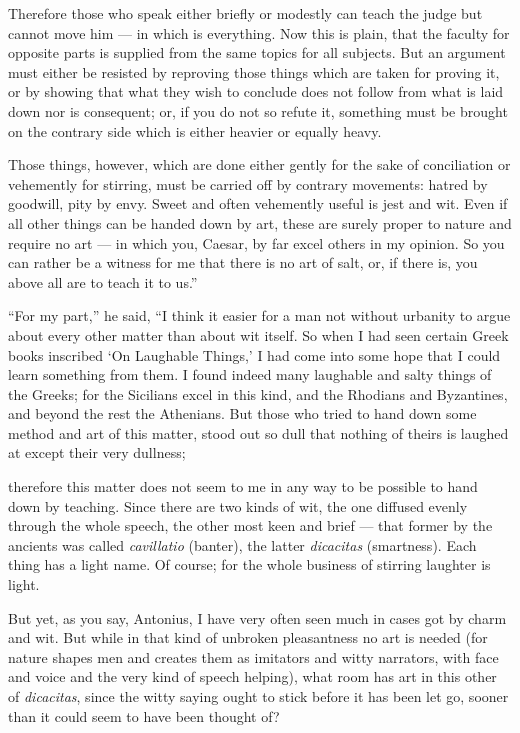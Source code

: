  Therefore those who speak either briefly or modestly can teach the judge but cannot move him — in which is everything. Now this is plain, that the faculty for opposite parts is supplied from the same topics for all subjects. But an argument must either be resisted by reproving those things which are taken for proving it, or by showing that what they wish to conclude does not follow from what is laid down nor is consequent; or, if you do not so refute it, something must be brought on the contrary side which is either heavier or equally heavy.

 Those things, however, which are done either gently for the sake of conciliation or vehemently for stirring, must be carried off by contrary movements: hatred by goodwill, pity by envy. Sweet and often vehemently useful is jest and wit. Even if all other things can be handed down by art, these are surely proper to nature and require no art — in which you, Caesar, by far excel others in my opinion. So you can rather be a witness for me that there is no art of salt, or, if there is, you above all are to teach it to us.''

 ``For my part,'' he said, ``I think it easier for a man not without urbanity to argue about every other matter than about wit itself. So when I had seen certain Greek books inscribed `On Laughable Things,' I had come into some hope that I could learn something from them. I found indeed many laughable and salty things of the Greeks; for the Sicilians excel in this kind, and the Rhodians and Byzantines, and beyond the rest the Athenians. But those who tried to hand down some method and art of this matter, stood out so dull that nothing of theirs is laughed at except their very dullness;

 therefore this matter does not seem to me in any way to be possible to hand down by teaching. Since there are two kinds of wit, the one diffused evenly through the whole speech, the other most keen and brief — that former by the ancients was called \textit{cavillatio} (banter), the latter \textit{dicacitas} (smartness). Each thing has a light name. Of course; for the whole business of stirring laughter is light.

 But yet, as you say, Antonius, I have very often seen much in cases got by charm and wit. But while in that kind of unbroken pleasantness no art is needed (for nature shapes men and creates them as imitators and witty narrators, with face and voice and the very kind of speech helping), what room has art in this other of \textit{dicacitas}, since the witty saying ought to stick before it has been let go, sooner than it could seem to have been thought of?

